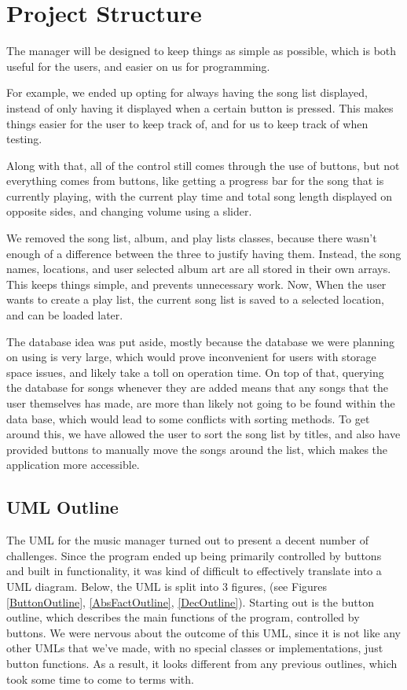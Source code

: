 \documentclass[10pt,conference,onecolumn,compsoc]{IEEEtran}
\begin{document}
\section{Project Structure}
The manager will be designed to keep things as simple as possible, which is both useful for the users, and easier on us for programming.

For example, we ended up opting for always having the song list displayed, instead of only having it displayed when a certain button is pressed. This makes things easier for the user to keep track of, and for us to keep track of when testing.

Along with that, all of the control still comes through the use of buttons, but not everything comes from buttons, like getting a progress bar for the song that is currently playing, with the current play time and total song length displayed on opposite sides, and changing volume using a slider. 

We removed the song list, album, and play lists classes, because there wasn't enough of a difference between the three to justify having them. Instead, the song names, locations, and user selected album art are all stored in their own arrays. This keeps things simple, and prevents unnecessary work. Now, When the user wants to create a play list, the current song list is saved to a selected location, and can be loaded later.

The database idea was put aside, mostly because the database we were planning on using is very large, which would prove inconvenient for users with storage space issues, and likely take a toll on operation time. On top of that, querying the database for songs whenever they are added means that any songs that the user themselves has made, are more than likely not going to be found within the data base, which would lead to some conflicts with sorting methods. To get around this, we have allowed the user to sort the song list by titles, and also have provided buttons to manually move the songs around the list, which makes the application more accessible.

\subsection{UML Outline}
The UML for the music manager turned out to present a decent number of challenges. Since the program ended up being primarily controlled by buttons and built in functionality, it was kind of difficult to effectively translate into a UML diagram. Below, the UML is split into 3 figures, (see Figures \ref{ButtonOutline}, \ref{AbsFactOutline}, \ref{DecOutline}). Starting out is the button outline, which describes the main functions of the program, controlled by buttons. We were nervous about the outcome of this UML, since it is not like any other UMLs that we've made, with no special classes or implementations, just button functions. As a result, it looks different from any previous outlines, which took some time to come to terms with.
\end{document}
